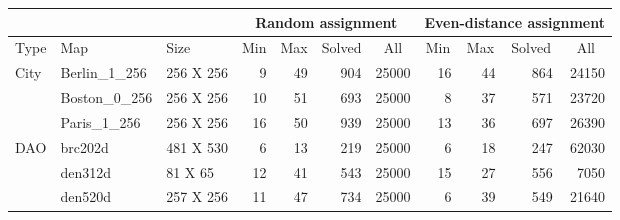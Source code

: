 \begin{table*}[]
\begin{tabular}{@{}lll|rrrr|rrrr@{}}
\toprule
                                &                       &            & \multicolumn{4}{c}{Random assignment}                                                                    & \multicolumn{4}{c}{Even-distance assignment}                                                             \\ \midrule
Type                            & Map                   & Size       & \multicolumn{1}{c}{Min} & \multicolumn{1}{c}{Max} & \multicolumn{1}{c}{Solved} & \multicolumn{1}{c}{All} & \multicolumn{1}{c}{Min} & \multicolumn{1}{c}{Max} & \multicolumn{1}{c}{Solved} & \multicolumn{1}{c}{All} \\ 
\toprule
\multirow{3}{*}{City}                            & Berlin\_1\_256        & 256 X 256  & 9                       & 49                      & 904                        & 25000                   & 16                      & 44                      & 864                        & 24150                   \\
                            & Boston\_0\_256        & 256 X 256  & 10                      & 51                      & 693                        & 25000                   & 8                       & 37                      & 571                        & 23720                   \\
                            & Paris\_1\_256         & 256 X 256  & 16                      & 50                      & 939                        & 25000                   & 13                      & 36                      & 697                        & 26390                   \\
\midrule \multirow{6}{*}{DAO}            & brc202d               & 481 X 530  & 6                       & 13                      & 219                        & 25000                   & 6                       & 18                      & 247                        & 62030                   \\
                                & den312d               & 81 X 65    & 12                      & 41                      & 543                        & 25000                   & 15                      & 27                      & 556                        & 7050                    \\
                                & den520d               & 257 X 256  & 11                      & 47                      & 734                        & 25000                   & 6                       & 39                      & 549                        & 21640                   \\

\end{tabular}
\end{table*}
